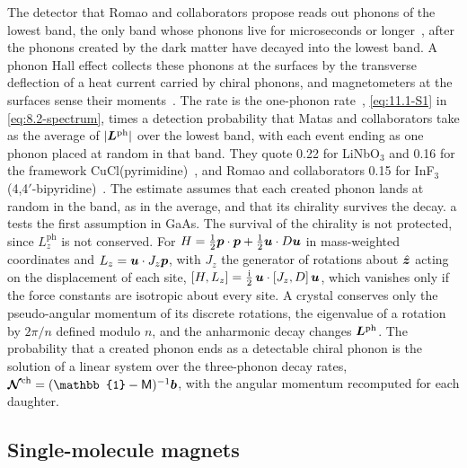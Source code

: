 The detector that Romao and collaborators propose reads out phonons of the lowest band, the only band whose phonons live for microseconds or longer~\cite[Sect.~III]{matas2025chiral}, after the phonons created by the dark matter have decayed into the lowest band. A phonon Hall effect collects these phonons at the surfaces by the transverse deflection of a heat current carried by chiral phonons, and magnetometers at the surfaces sense their moments~\cite[Sect.~IV]{romao2023chiral}. The rate is the one-phonon rate~\cite[Eqs.~(3), (4)]{matas2025chiral}, \cref{eq:11.1-S1} in \cref{eq:8.2-spectrum}, times a detection probability that Matas and collaborators take as the average of $|\bm{L}^{\mathrm{ph}}|$ over the lowest band, with each event ending as one phonon placed at random in that band. They quote 0.22 for LiNbO$_3$ and 0.16 for the framework CuCl(pyrimidine)~\cite[Sect.~III]{matas2025chiral}, and Romao and collaborators 0.15 for InF$_3$(4,4$'$-bipyridine)~\cite[Sect.~VII]{romao2023chiral}. The estimate assumes that each created phonon lands at random in the band, as in the average, and that its chirality survives the decay. a tests the first assumption in GaAs. The survival of the chirality is not protected, since $L^{\mathrm{ph}}_z$ is not conserved. For $H = \frac12\bm{p}\cdot\bm{p} + \frac12\bm{u}\cdot D\bm{u}$ in mass-weighted coordinates and $L_z = \bm{u}\cdot J_z\bm{p}$, with $J_z$ the generator of rotations about $\hat{\bm{z}}$ acting on the displacement of each site, $[H, L_z] = \frac{\mathrm{i}}{2}\,\bm{u}\cdot[J_z, D]\,\bm{u}$, which vanishes only if the force constants are isotropic about every site. A crystal conserves only the pseudo-angular momentum of its discrete rotations, the eigenvalue of a rotation by $2\pi/n$ defined modulo $n$, and the anharmonic decay changes $\bm{L}^{\mathrm{ph}}$. The probability that a created phonon ends as a detectable chiral phonon is the solution of a linear system over the three-phonon decay rates, $\boldsymbol{\mathcal{N}}^{\mathrm{ch}} = (\mathbb{1} - \mathsf{M})^{-1}\vect{b}$, with the angular momentum recomputed for each daughter.

\subsection{Single-molecule magnets}\label{sec:14.5-smm}

